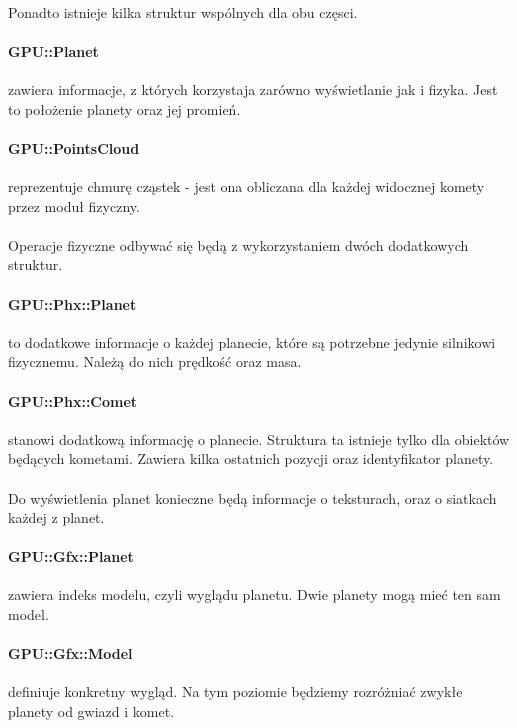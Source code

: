 \paragraph{}
Ponadto istnieje kilka struktur wspólnych dla obu częsci.

\paragraph{GPU::Planet} zawiera informacje, z których korzystaja zarówno wyświetlanie jak i fizyka. Jest to położenie planety oraz jej promień.
\paragraph{GPU::PointsCloud} reprezentuje chmurę cząstek - jest ona obliczana dla każdej widocznej komety przez moduł fizyczny.

\paragraph{}
Operacje fizyczne odbywać się będą z wykorzystaniem dwóch dodatkowych struktur.

\paragraph{GPU::Phx::Planet} to dodatkowe informacje o każdej planecie, które są potrzebne jedynie silnikowi fizycznemu. Należą do nich prędkość oraz masa.
\paragraph{GPU::Phx::Comet} stanowi dodatkową informację o planecie. Struktura ta istnieje tylko dla obiektów będących kometami. Zawiera kilka ostatnich pozycji oraz identyfikator planety.

\paragraph{}
Do wyświetlenia planet konieczne będą informacje o teksturach, oraz o siatkach każdej z planet.

\paragraph{GPU::Gfx::Planet} zawiera indeks modelu, czyli wyglądu planetu. Dwie planety mogą mieć ten sam model.
\paragraph{GPU::Gfx::Model} definiuje konkretny wygląd. Na tym poziomie będziemy rozróżniać zwykłe planety od gwiazd i komet.
